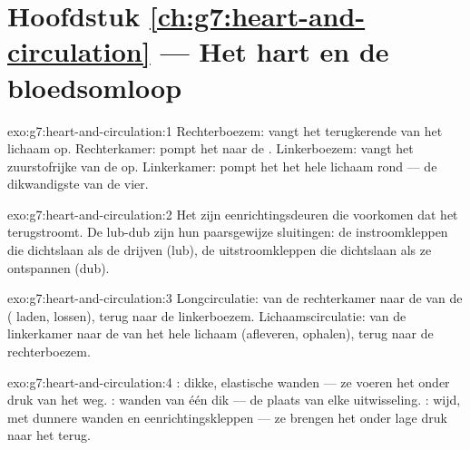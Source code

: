 \section*{Hoofdstuk \ref{ch:g7:heart-and-circulation} --- Het hart en de bloedsomloop}

\begin{solution}{exo:g7:heart-and-circulation:1}
Rechterboezem: vangt het terugkerende  van het lichaam op.
Rechterkamer: pompt het naar de . Linkerboezem: vangt het
zuurstofrijke  van de  op. Linkerkamer: pompt het het hele
lichaam rond --- de dikwandigste van de vier.
\end{solution}

\begin{solution}{exo:g7:heart-and-circulation:2}
Het zijn eenrichtingsdeuren die voorkomen dat het  terugstroomt. De
lub-dub zijn hun paarsgewijze sluitingen: de instroomkleppen die
dichtslaan als de  drijven (lub), de uitstroomkleppen die dichtslaan
als ze ontspannen (dub).
\end{solution}

\begin{solution}{exo:g7:heart-and-circulation:3}
Longcirculatie: van de rechterkamer naar de  van de 
( laden,  lossen), terug naar de linkerboezem.
Lichaamscirculatie: van de linkerkamer naar de  van het hele
lichaam (afleveren, ophalen), terug naar de rechterboezem.
\end{solution}

\begin{solution}{exo:g7:heart-and-circulation:4}
: dikke, elastische wanden --- ze voeren het  onder druk van
het  weg. : wanden van één  dik --- de plaats van elke
uitwisseling. : wijd, met dunnere wanden en eenrichtingskleppen ---
ze brengen het  onder lage druk naar het  terug.
\end{solution}

